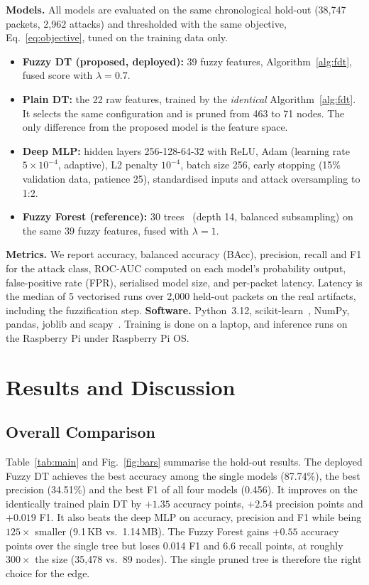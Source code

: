 \documentclass[conference]{IEEEtran}
\begin{document}
\textbf{Models.} All models are evaluated on the same chronological hold-out (38,747 packets, 2,962 attacks) and thresholded with the same objective, Eq.~\eqref{eq:objective}, tuned on the training data only.
\begin{itemize}
  \item \textbf{Fuzzy DT (proposed, deployed):} 39 fuzzy features, Algorithm~\ref{alg:fdt}, fused score with $\lambda=0.7$.
  \item \textbf{Plain DT:} the 22 raw features, trained by the \emph{identical} Algorithm~\ref{alg:fdt}. It selects the same configuration and is pruned from 463 to 71 nodes. The only difference from the proposed model is the feature space.
  \item \textbf{Deep MLP:} hidden layers 256-128-64-32 with ReLU, Adam (learning rate $5\times10^{-4}$, adaptive), L2 penalty $10^{-4}$, batch size 256, early stopping (15\% validation data, patience 25), standardised inputs and attack oversampling to 1:2.
  \item \textbf{Fuzzy Forest (reference):} 30 trees~\cite{breiman2001} (depth 14, balanced subsampling) on the same 39 fuzzy features, fused with $\lambda=1$.
\end{itemize}
\textbf{Metrics.} We report accuracy, balanced accuracy (BAcc), precision, recall and F1 for the attack class, ROC-AUC computed on each model's probability output, false-positive rate (FPR), serialised model size, and per-packet latency. Latency is the median of 5 vectorised runs over 2,000 held-out packets on the real artifacts, including the fuzzification step.
\textbf{Software.} Python~3.12, scikit-learn~\cite{pedregosa2011}, NumPy, pandas, joblib and scapy~\cite{scapy}. Training is done on a laptop, and inference runs on the Raspberry Pi under Raspberry Pi OS.

\section{Results and Discussion}
\label{sec:results}

\subsection{Overall Comparison}
Table~\ref{tab:main} and Fig.~\ref{fig:bars} summarise the hold-out results. The deployed Fuzzy DT achieves the best accuracy among the single models (87.74\%), the best precision (34.51\%) and the best F1 of all four models (0.456). It improves on the identically trained plain DT by $+1.35$ accuracy points, $+2.54$ precision points and $+0.019$ F1. It also beats the deep MLP on accuracy, precision and F1 while being $125\times$ smaller (9.1\,KB vs.\ 1.14\,MB). The Fuzzy Forest gains $+0.55$ accuracy points over the single tree but loses 0.014 F1 and 6.6 recall points, at roughly $300\times$ the size (35,478 vs.\ 89 nodes). The single pruned tree is therefore the right choice for the edge.
\end{document}

